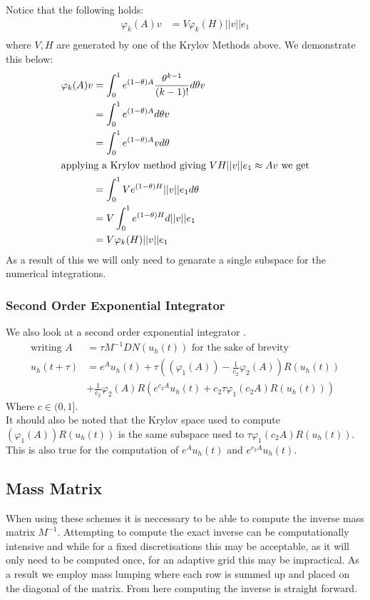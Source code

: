 Notice that the following holds:
\begin{align*}
    \varphi_k(A)v &= V\varphi_k(H)||v||e_1\\
\end{align*}
where $V,H$ are generated by one of the Krylov Methods above. 
We demonstrate this below:
\begin{align*}
    \varphi_k(A)v &= \int^1_0e^{(1-\theta)A}\frac{\theta^{k-1}}{(k-1)!}d\theta v\\
    &= \int^1_0e^{(1-\theta) A}d\theta v\\
    &= \int^1_0e^{(1-\theta) A}vd\theta\\
\intertext{applying a Krylov method giving $VH||v||e_1 \approx Av$ we get}
    &= \int^1_0Ve^{(1-\theta) H}||v||e_1d\theta\\
    &= V\int^1_0e^{(1-\theta) H}d||v||e_1\\
    &= V\varphi_k(H)||v||e_1
\end{align*}
As a result of this we will only need to genarate a single subspace for the numerical integrations.

\subsubsection{Second Order Exponential Integrator}
We also look at a second order exponential integrator \cite{Huang2022}.
\begin{align*}
    \text{writing } A &= \tau M^{-1} DN(u_h(t)) \text{ for the sake of brevity}\\
    u_h(t+\tau) &= e^{A}u_h(t) + \tau((\varphi_1(A)) - \frac 1{c_2}\varphi_2(A))R(u_h(t))\\
    & + \frac1{c_2}\varphi_2(A)R(e^{c_2A}u_h(t) + c_2\tau\varphi_1(c_2 A)R(u_h(t)))
\end{align*}
Where $c \in (0,1]$.\\
It should also be noted that the Krylov space used to compute $(\varphi_1(A))R(u_h(t))$ is the same subspace used to $\tau\varphi_1(c_2 A)R(u_h(t))$.
This is also true for the computation of $e^{A}u_h(t)$ and $e^{c_2A}u_h(t)$.

\subsection{Mass Matrix}
When using these schemes it is neccessary to be able to compute the inverse mass matrix $M^{-1}$.
Attempting to compute the exact inverse can be computationally intensive and while for a fixed discretisations this may be acceptable, as it will only need to be computed once, for an adaptive grid this may be impractical.
As a result we employ mass lumping where each row is summed up and placed on the diagonal of the matrix.
From here computing the inverse is straight forward.

